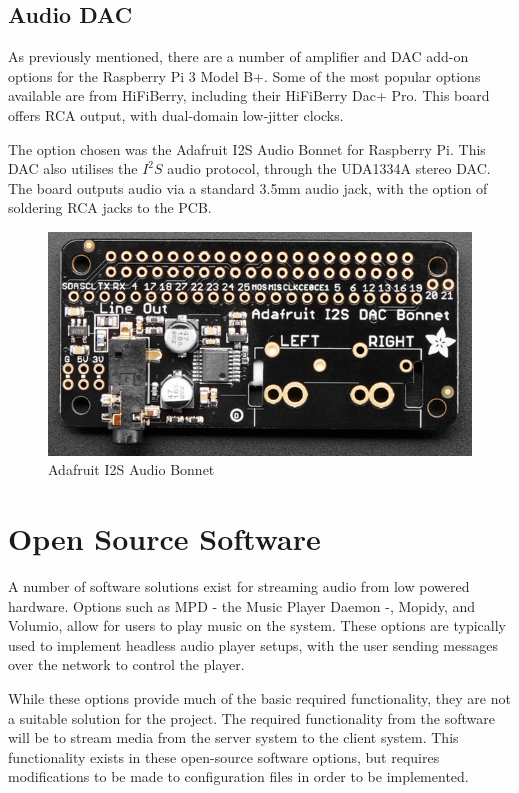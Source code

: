 \documentclass[11pt,a4paper,headinclude=false,footinclude=false]{scrreprt}
\begin{document}
\subsection{Audio DAC}\label{audio-dac}

As previously mentioned, there are a number of amplifier and DAC add-on
options for the Raspberry Pi 3 Model B+. Some of the most popular
options available are from HiFiBerry, including their HiFiBerry Dac+
Pro. This board offers RCA output, with dual-domain low-jitter
clocks\cite{HiFiBerry}.

The option chosen was the Adafruit I2S Audio Bonnet for Raspberry Pi.
This DAC also utilises the \(I^2S\) audio protocol, through the UDA1334A
stereo DAC. The board outputs audio via a standard 3.5mm audio jack,
with the option of soldering RCA jacks to the PCB.

\begin{figure}[H]
\includegraphics{BackgroundLitSurvey/adafruitdac.png}
\centering
\caption{Adafruit I2S Audio Bonnet \cite{adafruit}}
\label{AdaFig}
\end{figure}

\section{Open Source Software}\label{open-source-software}

A number of software solutions exist for streaming audio from low
powered hardware. Options such as MPD - the Music Player Daemon -,
Mopidy, and Volumio, allow for users to play music on the system. These
options are typically used to implement headless audio player setups,
with the user sending messages over the network to control the player.

While these options provide much of the basic required functionality,
they are not a suitable solution for the project. The required
functionality from the software will be to stream media from the server
system to the client system. This functionality exists in these
open-source software options, but requires modifications to be made to
configuration files in order to be implemented.
\end{document}
